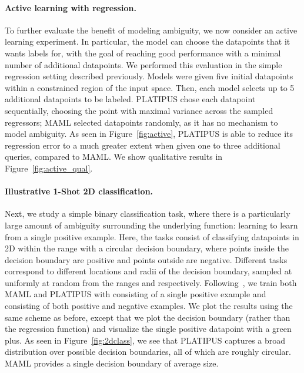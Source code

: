 \documentclass{article}
\begin{document}
\paragraph{Active learning with regression.} To further evaluate the benefit of modeling
ambiguity, we now consider an active learning experiment.
In particular, the model can choose the datapoints that it wants labels for, with the goal of reaching good performance with a minimal number of additional datapoints. We performed this evaluation in the simple regression setting described previously. Models were given five initial datapoints within a constrained region of the input space. Then, each model selects up to 5 additional datapoints to be labeled. PLATIPUS chose each datapoint sequentially, choosing the point with maximal variance across the sampled regressors; MAML selected datapoints randomly, as it has no mechanism to model ambiguity. As seen in Figure~\ref{fig:active}, PLATIPUS is able to reduce its regression error to a much greater extent when given one to three additional queries, compared to MAML. We show qualitative results in Figure~\ref{fig:active_qual}.





\vspace{-0.1in}
\paragraph{Illustrative 1-Shot 2D classification.}
Next, we study a simple binary classification task, where there is a particularly large amount of ambiguity surrounding the underlying function: learning to learn from a single positive example. Here, the tasks consist of classifying datapoints in 2D within the range  with a circular decision boundary, where points inside the decision boundary are positive and points outside are negative. Different tasks correspond to different locations and radii of the decision boundary, sampled at uniformly at random from the ranges  and  respectively.
Following~\citet{grant2017workshop}, we train both MAML and PLATIPUS with  consisting of a single positive example and  consisting of both positive and negative examples.
We plot the results using the same scheme as before, except that we plot the decision boundary (rather than the regression function) and visualize the single positive datapoint with a green plus. As seen in Figure~\ref{fig:2dclass}, we see that PLATIPUS captures a broad distribution over possible decision boundaries, all of which are roughly circular. MAML provides a single decision boundary of average size.
\end{document}

